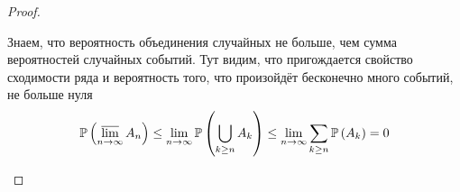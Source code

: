 \begin{proof}
\begin{enumerate}[label=\alph*]
        Знаем, что вероятность объединения случайных не больше,
        чем сумма вероятностей случайных событий.
        Тут видим, что пригождается свойство сходимости ряда и вероятность того,
        что произойдёт бесконечно много событий, не больше нуля
        $$\mathbb{P}\left( \varlimsup\limits_{n\to\infty} A_n \right)
            \le\lim\limits_{n\to\infty}\mathbb{P}\left( \bigcup_{k\ge n} A_k \right)
            \le\lim\limits_{n\to\infty}\sum_{k\ge n}\mathbb{P}\left( A_k \right)=0$$
    \end{enumerate}
\end{proof}
